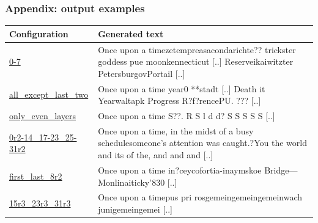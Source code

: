 \documentclass{beamer}
\begin{document}
\begin{frame}
  \frametitle{Appendix: output examples}
  \begin{table}[h]
    \centering
    \begin{tabular}{|l|p{}|}
        \hline
        \textbf{Configuration} & \textbf{Generated text} \\ \hline
        \small \url{0-7} & {\small Once upon a timezetempreasacondarichte?? trickster goddess pue moonkennecticut [..] Reserveikaiwitzter PetersburgovPortail [..]} \\ \hline
        \small \url{all_except_last_two} & {\small Once upon a time year0 **stadt [..] Death it Yearwaltapk Progress R?f?rencePU. ??? [..]} \\ \hline
        \small \url{only_even_layers} & {\small Once upon a time S??. R S l d d? S S S S S [..]} \\ \hline
        \small \url{0r2-14_17-23_25-31r2} & {\small Once upon a time, in the midst of a busy schedulesomeone's attention was caught.?You the world and its of the, and and and [..]} \\ \hline
        \small \url{first_last_8r2} &{\small Once upon a time in?ceycofortia-inaymskoe Bridge---Monlinaiticky'830 [..]} \\ \hline
        \small \url{15r3_23r3_31r3} &{\small Once upon a timepus pri rosgemeingemeingemeinwach junigemeingemei [..]} \\ \hline
      \end{tabular}
    \label{tab:generated_text}
  \end{table}
\end{frame}
\end{document}
